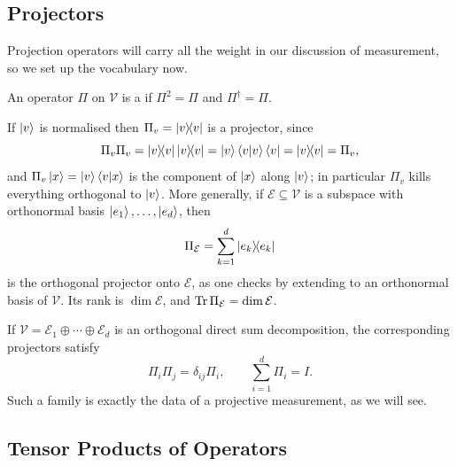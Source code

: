 \documentclass[a4paper]{scrartcl}
\newcommand{\Vs}{\mathcal{V}}
\newcommand{\Es}{\mathcal{E}}
\begin{document}
\subsection{Projectors}

Projection operators will carry all the weight in our discussion of measurement, so we set up the vocabulary now.

\begin{definition}[Projector]
	An operator $\Pi$ on $\Vs$ is a  if $\Pi^2 = \Pi$ and $\Pi^\dagger = \Pi$.
\end{definition}

If $\ket{v}$ is normalised then $\Pi_v = \op{v}{v}$ is a projector, since
$$\Pi_v\Pi_v = \op{v}{v}\op{v}{v} = \ket{v}\ip{v}{v}\bra{v} = \op{v}{v} = \Pi_v,$$
and $\Pi_v \ket{x} = \ket{v}\ip{v}{x}$ is the component of $\ket{x}$ along $\ket{v}$; in particular $\Pi_v$ kills everything orthogonal to $\ket{v}$. More generally, if $\Es \subseteq \Vs$ is a subspace with orthonormal basis $\ket{e_1},\dots,\ket{e_d}$, then
$$\Pi_{\Es} = \sum_{k=1}^d \op{e_k}{e_k}$$
is the orthogonal projector onto $\Es$, as one checks by extending to an orthonormal basis of $\Vs$. Its rank is $\dim \Es$, and $\Tr \Pi_{\Es} = \dim\Es$.

If $\Vs = \Es_1 \oplus \cdots \oplus \Es_d$ is an orthogonal direct sum decomposition, the corresponding projectors satisfy
$$\Pi_i \Pi_j = \delta_{ij}\Pi_i, \qquad \sum_{i=1}^d \Pi_i = I.$$
Such a family is exactly the data of a projective measurement, as we will see.

\subsection{Tensor Products of Operators}\label{sec:tensorops}
\end{document}
